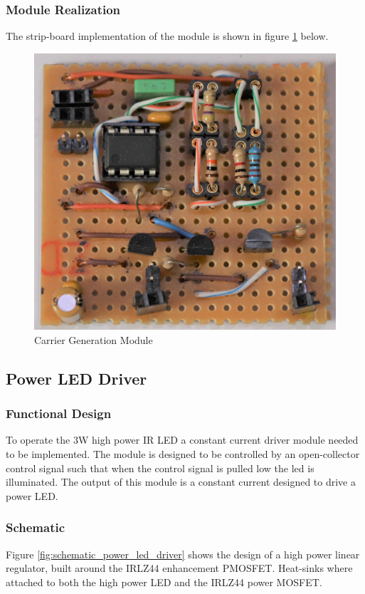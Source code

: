 \subsubsection{Module Realization}
The strip-board implementation of the module is shown in figure \ref{fig:module_carrier_generation} below.

\begin{figure}[H]
	\centering
	\includegraphics[width=.6\textwidth]{figures/modules/carrier_generator.jpg}
	\caption{Carrier Generation Module}
	\label{fig:module_carrier_generation}
\end{figure}






\subsection{Power LED Driver}

\subsubsection{Functional Design}
To operate the 3W high power IR LED a constant current driver module needed to be implemented. The module is designed to be controlled by an open-collector control signal such that when the control signal is pulled low the led is illuminated. The output of this module is a constant current designed to drive a power LED.

\subsubsection{Schematic}
Figure \ref{fig:schematic_power_led_driver} shows the design of a high power linear regulator, built around the IRLZ44 enhancement PMOSFET. Heat-sinks where attached to both the high power LED and the IRLZ44 power MOSFET.

